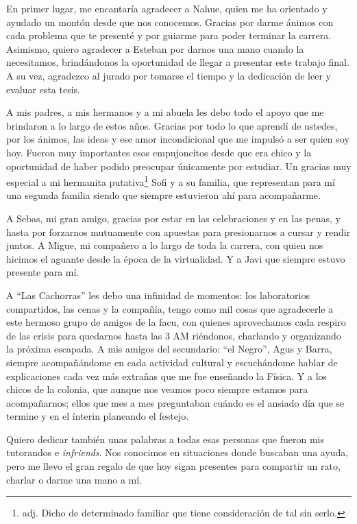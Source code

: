 \documentclass[letterpaper,12pt]{report}
\begin{document}
En primer lugar, me encantaría agradecer a Nahue, quien me ha orientado y ayudado un montón desde que nos conocemos. Gracias por darme ánimos con cada problema que te presenté y por guiarme para poder terminar la carrera. Asimismo, quiero agradecer a Esteban por darnos una mano cuando la necesitamos, brindándonos la oportunidad de llegar a presentar este trabajo final. A su vez, agradezco al jurado por tomarse el tiempo y la dedicación de leer y evaluar esta tesis.

A mis padres, a mis hermanos y a mi abuela les debo todo el apoyo que me brindaron a lo largo de estos años. Gracias por todo lo que aprendí de ustedes, por los ánimos, las ideas y ese amor incondicional que me impulsó a ser quien soy hoy. Fueron muy importantes esos empujoncitos desde que era chico y la oportunidad de haber podido preocupar únicamente por estudiar. Un gracias muy especial a mi hermanita putativa\footnote{adj. Dicho de determinado familiar que tiene consideración de tal sin serlo.} Sofi y a su familia, que representan para mí una segunda familia siendo que siempre estuvieron ahí para acompañarme.

A Sebas, mi gran amigo, gracias por estar en las celebraciones y en las penas, y hasta por forzarnos mutuamente con apuestas para presionarnos a cursar y rendir juntos. A Migue, mi compañero a lo largo de toda la carrera, con quien nos hicimos el aguante desde la época de la virtualidad. Y a Javi que siempre estuvo presente para mí.

A ``Las Cachorras'' les debo una infinidad de momentos: los laboratorios compartidos, las cenas y la compañía, tengo como mil cosas que agradecerle a este hermoso grupo de amigos de la facu, con quienes aprovechamos cada respiro de las crisis para quedarnos hasta las 3 AM riéndonos, charlando y organizando la próxima escapada. A mis amigos del secundario: ``el Negro'', Agus y Barra, siempre acompañándome en cada actividad cultural y escuchándome hablar de explicaciones cada vez más extrañas que me fue enseñando la Física. Y a los chicos de la colonia, que aunque nos veamos poco siempre estamos para acompañarnos; ellos que mes a mes preguntaban cuándo es el ansiado día que se termine y en el ínterin planeando el festejo.

Quiero dedicar también unas palabras a todas esas personas que fueron mis tutorandos e \textit{infriends}. Nos conocimos en situaciones donde buscaban una ayuda, pero me llevo el gran regalo de que hoy sigan presentes para compartir un rato, charlar o darme una mano a mí.
\end{document}
